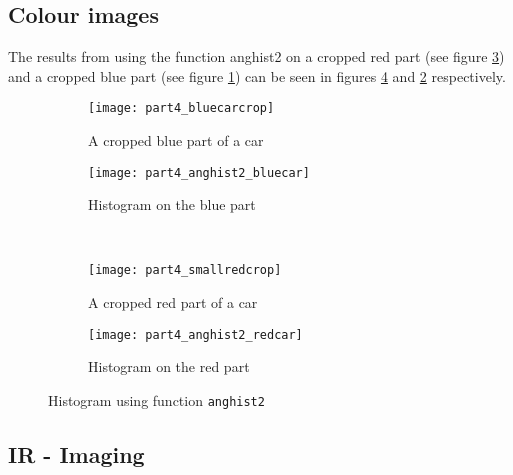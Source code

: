 \subsection{Colour images}
The results from using the function anghist2 on a cropped red part (see figure \ref{fig:redCrop}) and a cropped blue part (see figure \ref{fig:blueCrop}) can be seen in figures \ref{fig:redSpec} and \ref{fig:blueSpec} respectively.
\begin{figure}[h]
	\centering
	\begin{subfigure}[b]{0.4\textwidth}
		\texttt{[image: part4\_bluecarcrop]}
		\caption{A cropped blue part of a car}
		\label{fig:blueCrop}
	\end{subfigure}
	\begin{subfigure}[b]{0.4\textwidth}
		\texttt{[image: part4\_anghist2\_bluecar]}
		\caption{Histogram on the blue part}
		\label{fig:blueSpec}
	\end{subfigure}
	\\
	\begin{subfigure}[b]{0.4\textwidth}
		\texttt{[image: part4\_smallredcrop]}
		\caption{A cropped red part of a car}
		\label{fig:redCrop}
	\end{subfigure}
	\begin{subfigure}[b]{0.4\textwidth}
		\texttt{[image: part4\_anghist2\_redcar]}
		\caption{Histogram on the red part}
		\label{fig:redSpec}
	\end{subfigure}
	\caption{Histogram using function \texttt{anghist2}}
	\label{fig:colour}
\end{figure}

\subsection{IR - Imaging}

